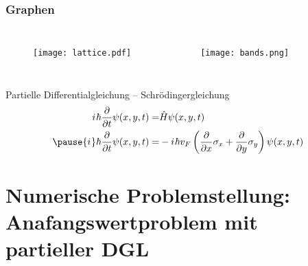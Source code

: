 \documentclass{beamer}
\newcommand{\iu}{{i\mkern1mu}} 	%
\begin{document}
  
\begin{frame}[t]%
  \frametitle{Graphen}
 \begin{columns}
     \begin{figure}\centering
      \texttt{[image: lattice.pdf]}
     \end{figure} 
   \begin{figure}\centering
      \texttt{[image: bands.png]}
     \end{figure}
 \end{columns}
 \pause
 \begin{block}{Partielle Differentialgleichung -- Schrödingergleichung}
  \begin{align*}
  \iu \hbar \frac{\partial}{\partial t}  \psi(x, y, t) =& \hat{H} \psi(x, y, t) \\
  \pause
    \iu \hbar \frac{\partial}{\partial t}  \psi(x, y, t) =& -\iu \hbar v_F \left(\frac{\partial}{\partial x}\sigma_x + \frac{\partial}{\partial y} \sigma_y \right) \psi(x, y, t)
   \end{align*}
 \end{block}
 
 \end{frame}

 \section{Numerische Problemstellung: Anafangswertproblem mit partieller DGL}
 
\end{document}

